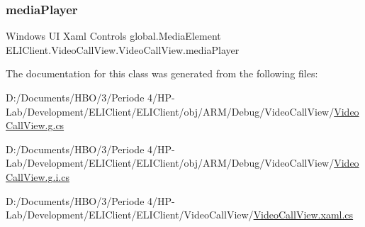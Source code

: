 \subsubsection{\texorpdfstring{media\+Player}{mediaPlayer}}
{\footnotesize\ttfamily Windows UI Xaml Controls global.\+Media\+Element E\+L\+I\+Client.\+Video\+Call\+View.\+Video\+Call\+View.\+media\+Player\hspace{0.3cm}{\ttfamily [private]}}



The documentation for this class was generated from the following files\+:\begin{DoxyCompactItemize}
\item 
D\+:/\+Documents/\+H\+B\+O/3/\+Periode 4/\+H\+P-\/\+Lab/\+Development/\+E\+L\+I\+Client/\+E\+L\+I\+Client/obj/\+A\+R\+M/\+Debug/\+Video\+Call\+View/\hyperlink{_a_r_m_2_debug_2_video_call_view_2_video_call_view_8g_8cs}{Video\+Call\+View.\+g.\+cs}\item 
D\+:/\+Documents/\+H\+B\+O/3/\+Periode 4/\+H\+P-\/\+Lab/\+Development/\+E\+L\+I\+Client/\+E\+L\+I\+Client/obj/\+A\+R\+M/\+Debug/\+Video\+Call\+View/\hyperlink{_a_r_m_2_debug_2_video_call_view_2_video_call_view_8g_8i_8cs}{Video\+Call\+View.\+g.\+i.\+cs}\item 
D\+:/\+Documents/\+H\+B\+O/3/\+Periode 4/\+H\+P-\/\+Lab/\+Development/\+E\+L\+I\+Client/\+E\+L\+I\+Client/\+Video\+Call\+View/\hyperlink{_video_call_view_8xaml_8cs}{Video\+Call\+View.\+xaml.\+cs}\end{DoxyCompactItemize}
